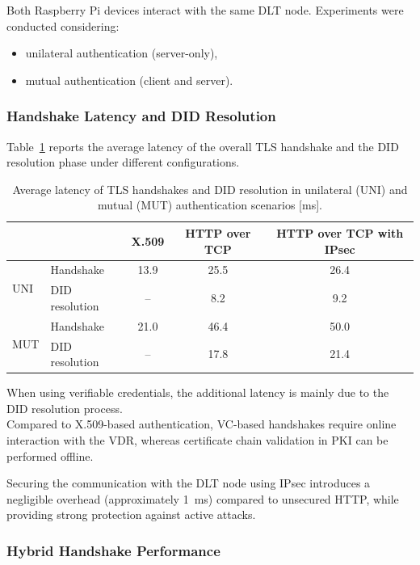 \noindent
Both Raspberry Pi devices interact with the same DLT node.  
Experiments were conducted considering:
\begin{itemize}
    \item unilateral authentication (server-only),
    \item mutual authentication (client and server).
\end{itemize}

\subsubsection*{Handshake Latency and DID Resolution}

\noindent
Table~\ref{tab:tls_latency} reports the average latency of the overall TLS handshake and the DID resolution phase under different configurations.

\begin{table}[h]
\centering
\caption{Average latency of TLS handshakes and DID resolution in unilateral (UNI) and mutual (MUT) authentication scenarios [ms].}
\label{tab:tls_latency}
\begin{tabular}{l|l|c|c|c}
\hline
 &  & X.509 & HTTP over TCP & HTTP over TCP with IPsec \\ \hline
\multirow{2}{*}{UNI} 
& Handshake & 13.9 & 25.5 & 26.4 \\
& DID resolution & -- & 8.2 & 9.2 \\ \hline
\multirow{2}{*}{MUT} 
& Handshake & 21.0 & 46.4 & 50.0 \\
& DID resolution & -- & 17.8 & 21.4 \\ \hline
\end{tabular}
\end{table}

\noindent
When using verifiable credentials, the additional latency is mainly due to the DID resolution process.\\  
Compared to X.509-based authentication, VC-based handshakes require online interaction with the VDR, whereas certificate chain validation in PKI can be performed offline.
\medskip

\noindent
Securing the communication with the DLT node using IPsec introduces a negligible overhead (approximately 1~ms) compared to unsecured HTTP, while providing strong protection against active attacks.

\subsubsection*{Hybrid Handshake Performance}

